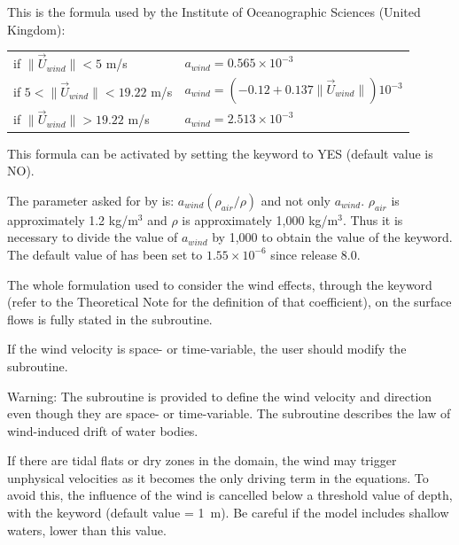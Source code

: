 This is the formula used by the Institute of Oceanographic Sciences (United
Kingdom):

\begin{tabular}{ll}
if $\| \vec{U}_{wind} \| < 5$ m/s & $a_{wind}  = 0.565 \times 10^{-3}$ \\
if $5 < \| \vec{U}_{wind} \| < 19.22$ m/s &
 $a_{wind} = (- 0.12 + 0.137 \| \vec{U}_{wind} \| ) 10^{-3}$ \\
if $\| \vec{U}_{wind} \| > 19.22$ m/s & $a_{wind} = 2.513 \times 10^{-3}$ \\
\end{tabular}

This formula can be activated by setting the keyword
 to YES
(default value is NO).

The parameter  asked for by 
is: $a_{wind} (\rho_{air} / \rho)$ and not only $a_{wind}$.
$\rho_{air}$ is approximately 1.2 kg/m$^3$ and $\rho$
is approximately 1,000 kg/m$^3$. Thus it is necessary to divide the value of
$a_{wind}$ by 1,000 to obtain the value of the  keyword.
The default value of  has been set to
$1.55 \times 10^{-6}$ since release 8.0.

The whole formulation used to consider the wind effects, through the keyword
 (refer to the Theoretical Note for the
definition of that coefficient), on the surface flows is fully stated in the
 subroutine.

If the wind velocity is space- or time-variable, the user should modify the
 subroutine.

\begin{WarningBlock}{Warning:}
The  subroutine is provided to define the wind velocity and
direction even though they are space- or time-variable.
The  subroutine describes the law of wind-induced drift
of water bodies.
\end{WarningBlock}

If there are tidal flats or dry zones in the domain, the wind may trigger
unphysical velocities as it becomes the only driving term in the equations.
To avoid this, the influence of the wind is cancelled below a threshold value
of depth, with the keyword 
(default value = 1~m).
Be careful if the model includes shallow waters, lower than this value.


